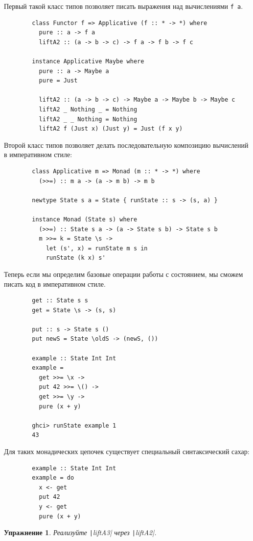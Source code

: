 \documentclass[12pt]{article}
\newtheorem{task}{Упражнение}
\begin{document}
    Первый такой класс типов позволяет писать выражения над вычислениями \texttt{f a}.
    \begin{verbatim}
        class Functor f => Applicative (f :: * -> *) where
          pure :: a -> f a
          liftA2 :: (a -> b -> c) -> f a -> f b -> f c

        instance Applicative Maybe where
          pure :: a -> Maybe a
          pure = Just

          liftA2 :: (a -> b -> c) -> Maybe a -> Maybe b -> Maybe c
          liftA2 _ Nothing _ = Nothing
          liftA2 _ _ Nothing = Nothing
          liftA2 f (Just x) (Just y) = Just (f x y)
    \end{verbatim}

    Второй класс типов позволяет делать последовательную композицию вычислений в императивном стиле:
    \begin{verbatim}
        class Applicative m => Monad (m :: * -> *) where
          (>>=) :: m a -> (a -> m b) -> m b

        newtype State s a = State { runState :: s -> (s, a) }

        instance Monad (State s) where
          (>>=) :: State s a -> (a -> State s b) -> State s b
          m >>= k = State \s ->
            let (s', x) = runState m s in
            runState (k x) s'
    \end{verbatim}

    Теперь если мы определим базовые операции работы с состоянием, мы сможем писать код в императивном стиле.
    \begin{verbatim}
        get :: State s s
        get = State \s -> (s, s)

        put :: s -> State s ()
        put newS = State \oldS -> (newS, ())

        example :: State Int Int
        example =
          get >>= \x ->
          put 42 >>= \() ->
          get >>= \y ->
          pure (x + y)

        ghci> runState example 1
        43
    \end{verbatim}

    Для таких монадических цепочек существует специальный синтаксический сахар:
    \begin{verbatim}
        example :: State Int Int
        example = do
          x <- get
          put 42
          y <- get
          pure (x + y)
    \end{verbatim}

    \begin{task}
        Реализуйте \texttt|liftA3| через \texttt|liftA2|.
    \end{task}
\end{document}

